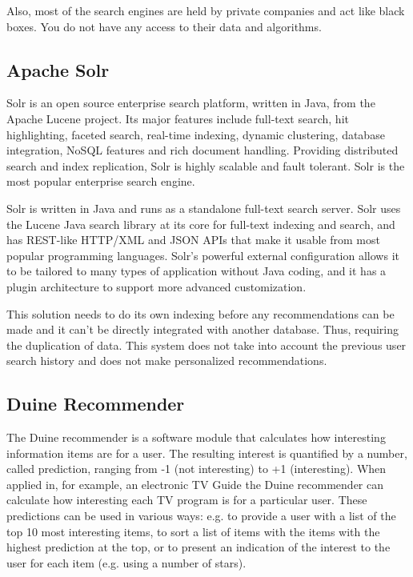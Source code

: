 Also, most of the search engines are held by private companies and act like black boxes. You do not have any access to their data and algorithms.


\subsection{Apache Solr}

Solr is an open source enterprise search platform, written in Java, from the Apache Lucene project. Its major features include full-text search, hit highlighting, faceted search, real-time indexing, dynamic clustering, database integration, NoSQL features and rich document handling. Providing distributed search and index replication, Solr is highly scalable and fault tolerant. Solr is the most popular enterprise search engine. 

Solr is written in Java and runs as a standalone full-text search server. Solr uses the Lucene Java search library at its core for full-text indexing and search, and has REST-like HTTP/XML and JSON APIs that make it usable from most popular programming languages. Solr's powerful external configuration allows it to be tailored to many types of application without Java coding, and it has a plugin architecture to support more advanced customization.

This solution needs to do its own indexing before any recommendations can be made and it can't be directly integrated with another database. Thus, requiring the duplication of data. This system does not take into account the previous user search history and does not make personalized recommendations.

\subsection{Duine Recommender }
The Duine recommender is a software module that calculates how interesting information items are for a user. The resulting interest is quantified by a number, called prediction, ranging from -1 (not interesting) to +1 (interesting). When applied in, for example, an electronic TV Guide the Duine recommender can calculate how interesting each TV program is for a particular user. These predictions can be used in various ways: e.g. to provide a user with a list of the top 10 most interesting items, to sort a list of items with the items with the highest prediction at the top, or to present an indication of the interest to the user for each item (e.g. using a number of stars).

